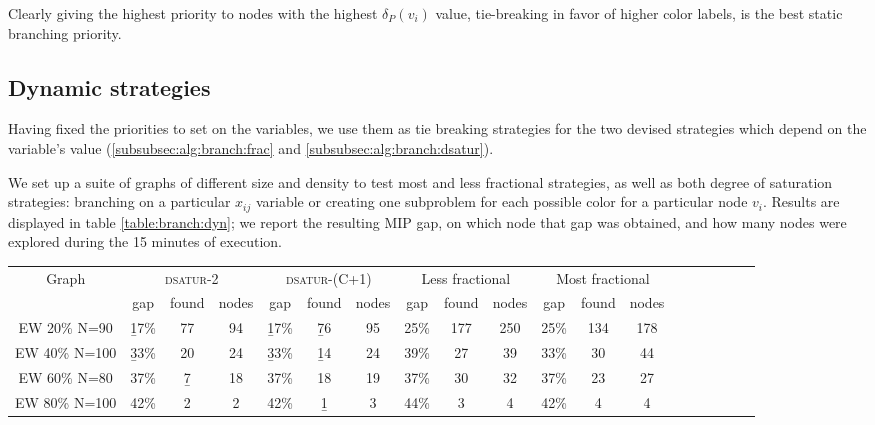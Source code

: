 Clearly giving the highest priority to nodes with the highest $\delta_P(v_i)$ value, tie-breaking in favor of higher color labels, is the best static branching priority.

\subsection{Dynamic strategies}

Having fixed the priorities to set on the variables, we use them as tie breaking strategies for the two devised strategies which depend on the variable's value (\ref{subsubsec:alg:branch:frac} and \ref{subsubsec:alg:branch:dsatur}). 

We set up a suite of graphs of different size and density to test most and less fractional strategies, as well as both degree of saturation strategies: branching on a particular $x_{ij}$ variable or creating one subproblem for each possible color for a particular node $v_i$. Results are displayed in table \ref{table:branch:dyn}; we report the resulting MIP gap, on which node that gap was obtained, and how many nodes were explored during the 15 minutes of execution.

\begin{sidewaystable}
\centering

\begin{tabular}{|c|ccc|ccc|ccc|ccc|ccc|ccc|}
\hline
\multicolumn{1}{|c|}{Graph} & \multicolumn{3}{|c|}{\textsc{dsatur-2}} & \multicolumn{3}{|c|}{\textsc{dsatur-(C+1)}} & \multicolumn{3}{|c|}{Less fractional} & \multicolumn{3}{|c|}{Most fractional} 
\\
 & gap & found & nodes & gap & found & nodes & gap & found & nodes & gap & found & nodes
\\
\hline
EW 20\% N=90 & \b{17\%} & 77 & 94 & \b{17\%} & \b{76} & 95 &25\% & 177 & 250 &25\% & 134 & 178 
\\
EW 40\% N=100 & \b{33\%} & 20 & 24 & \b{33\%} & \b{14} & 24 &39\% & 27 & 39 &33\% & 30 & 44 
\\
EW 60\% N=80 &37\% & \b{7} & 18 &37\% & 18 & 19 &37\% & 30 & 32 &37\% & 23 & 27 
\\
EW 80\% N=100 &42\% & 2 & 2 &42\% & \b{1} & 3 &44\% & 3 & 4 &42\% & 4 & 4
\\
\hline 
 \end{tabular}

\caption{Results for fractional and degree of saturation (spanning either $2$ or $C+1$ subproblems) branching strategies on branch and bound schemes. Data reported is MIP gap after $15$ minutes of execution, on which node (in thousands) that gap was found, and how many nodes (in thousands) were explored in total.}
\label{table:branch:dyn}

\end{sidewaystable}

